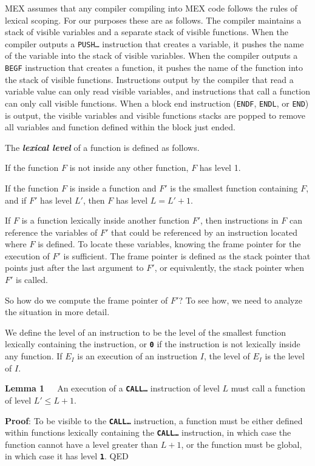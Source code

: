 \documentclass[12pt]{article}
\newcommand{\TT}[1]{{\tt \bfseries #1}}
\newcommand{\key}[1]{{\bf \em #1}\index{#1}}
\newenvironment{indpar}[1][0.3in]%
	{\begin{list}{}%
		     {\setlength{\itemsep}{0in}%
		      \setlength{\topsep}{0in}%
		      \setlength{\parsep}{1ex}%
		      \setlength{\labelwidth}{#1}%
		      \setlength{\leftmargin}{#1}%
		      \addtolength{\leftmargin}{\labelsep}}%
	 \item}%
	{\end{list}}
\begin{document}
MEX assumes that any compiler compiling into MEX code follows the
rules of lexical scoping.  For our purposes these are as follows.
The compiler maintains a stack of visible variables and a separate
stack of visible functions.  When the compiler outputs a {\tt PUSH\ldots}
instruction that creates a variable, it pushes the name of the variable
into the stack of visible variables.  When the compiler outputs a {\tt BEGF}
instruction that creates a function, it pushes the name of the function
into the stack of visible functions.  Instructions output by the compiler
that read a variable value can only read visible variables, and 
instructions that call a function can only call visible functions.
When a block end instruction ({\tt ENDF}, {\tt ENDL}, or {\tt END}) is
output, the visible variables and visible functions stacks are popped to
remove all variables and function defined within the block just ended.

The \key{lexical level}\label{LEXICAL-LEVEL}
of a function is defined as follows.

If the function $F$ is not inside any other function, $F$ has
level 1.

If the function $F$ is inside a function and $F'$ is the smallest
function containing $F$, and if $F'$ has level $L'$, then $F$
has level $L=L'+1$.

If $F$ is a function lexically inside another function $F'$, then instructions
in $F$ can reference the variables of $F'$ that could be referenced by
an instruction located where $F$ is defined.
To locate these variables, knowing the frame pointer for the
execution of $F'$ is sufficient.  The frame pointer is defined as the
stack pointer that points just after the last argument to $F'$,
or equivalently, the stack
pointer when $F'$ is called.

So how do we compute the frame pointer of $F'$?  To see how,
we need to analyze the situation in more detail.

We define the level of an instruction to be the level of the
smallest function lexically containing the instruction, or \TT{0} if the
instruction is not lexically inside any function.  If $E_I$ is an
execution of an instruction $I$, the level of $E_I$ is the
level of $I$.

\begin{indpar}
{\bf Lemma 1}\label{LEMMA-1}~~~An execution of a \TT{CALL\ldots} instruction of
level $L$ must call a function of level $L'\leq L+1$.
\end{indpar}
\begin{indpar}
{\bf Proof}: To be visible to the \TT{CALL\ldots}
instruction, a function must be either defined within functions
lexically containing the \TT{CALL\ldots} instruction, in which case the
function cannot have a level greater than $L+1$, or the function must be global,
in which case it has level \TT{1}.  QED
\end{indpar}
\end{document}
